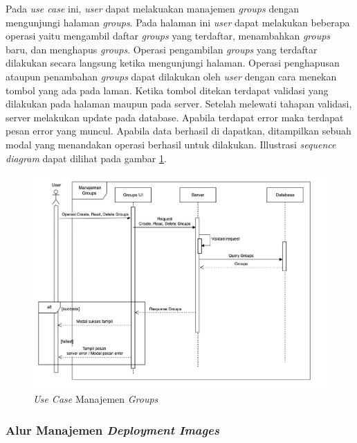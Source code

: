 Pada \textit{use case} ini, \textit{user} dapat melakuakan manajemen \textit{groups} dengan mengunjungi halaman \textit{groups}. Pada halaman ini \textit{user} dapat melakukan beberapa operasi yaitu mengambil daftar \textit{groups} yang terdaftar, menambahkan \textit{groups} baru, dan menghapus \textit{groups}. Operasi pengambilan \textit{groups} yang terdaftar dilakukan secara langsung ketika mengunjungi halaman. Operasi penghapusan ataupun penambahan \textit{groups} dapat dilakukan oleh \textit{user} dengan cara menekan tombol yang ada pada laman. Ketika tombol ditekan terdapat validasi yang dilakukan pada halaman maupun pada server. Setelah melewati tahapan validasi, server melakukan update pada database. Apabila terdapat error maka terdapat pesan error yang muncul. Apabila data berhasil di dapatkan, ditampilkan sebuah modal yang menandakan operasi berhasil untuk dilakukan. Illustrasi \textit{sequence diagram} dapat dilihat pada gambar \ref{fig:usecase-09}.


\begin{figure}[ht]
  \centering
  \includegraphics[width=1\textwidth]{resources/chapter-3/usecase/uc-09.jpg}
  \caption{\textit{Use Case} Manajemen \textit{Groups}}
  \label{fig:usecase-09}
\end{figure}

\pagebreak

\subsubsection{Alur Manajemen \textit{Deployment Images}}

